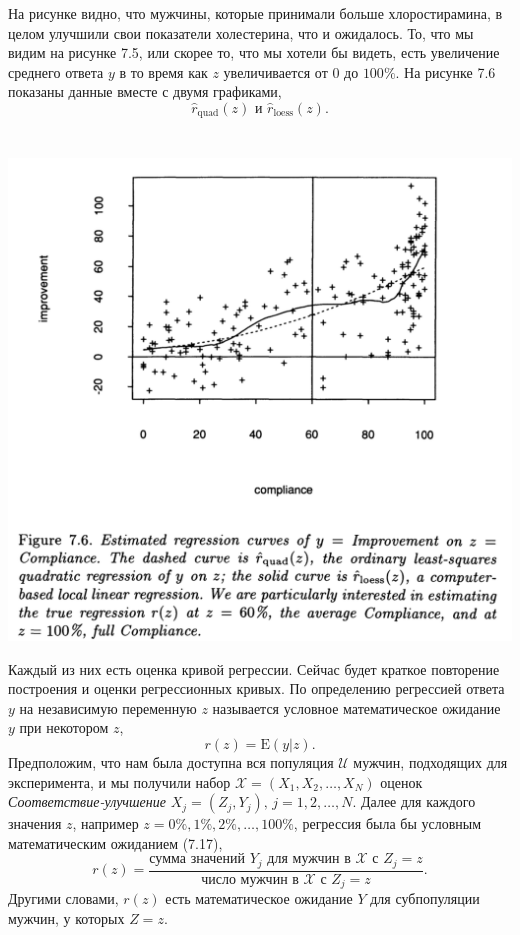  На рисунке видно, что мужчины, которые принимали больше хлоростирамина, в целом улучшили свои показатели холестерина, что и ожидалось. То, что мы видим на рисунке 7.5, или скорее то, что мы хотели бы видеть, есть увеличение среднего ответа $y$ в то время как $z$ увеличивается от 0 до $100\%$. На рисунке 7.6 показаны данные вместе с двумя графиками,
\begin{equation}
\hat r_\text{quad}(z) \text{ и }  \hat r_\text{loess}(z).
\end{equation}
\\~\\
\noindent
\includegraphics[width=0.9\linewidth]{6/f76.png}
\newline
\setcounter{figure}{7}

Каждый из них есть оценка кривой регрессии. Сейчас будет краткое повторение построения и оценки регрессионных кривых.
По определению регрессией ответа $y$ на независимую переменную $z$ называется условное математическое ожидание $y$ при некотором $z$,
\begin{equation}
  r(z) = \mathrm E(y|z).
\end{equation}
Предположим, что нам была доступна вся популяция $\mathcal U$ мужчин, подходящих для эксперимента, и мы получили набор $\mathcal X = (X_1,X_2,\ldots, X_N)$ оценок \textit{Соответствие-улучшение} $X_j = (Z_j, Y_j),\, j = 1,2,\ldots,N.$ Далее для каждого значения $z$, например $z = 0\%,1\%,2\%,\ldots,100\%$, регрессия была бы условным математическим ожиданием (7.17),
\begin{equation}
  r(z) = \frac{\text{сумма значений $Y_j$ для мужчин в $\mathcal X$ с $Z_j = z$}}{\text{число мужчин в $\mathcal X$ с $Z_j = z$}}.
\end{equation}
 Другими словами, $r(z)$ есть математическое ожидание $Y$ для субпопуляции мужчин, у которых $Z= z$.
 
